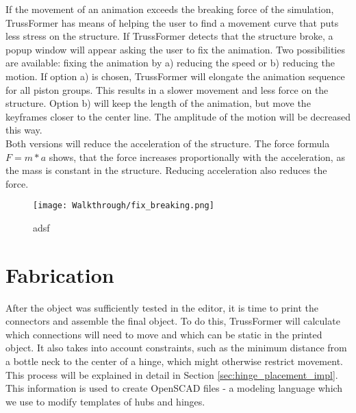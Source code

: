 If the movement of an animation exceeds the breaking force of the simulation, TrussFormer has means of helping the user to find a movement curve that puts less stress on the structure. If TrussFormer detects that the structure broke, a popup window will appear asking the user to fix the animation. Two possibilities are available: fixing the animation by a) reducing the speed or b) reducing the motion. If option a) is chosen, TrussFormer will elongate the animation sequence for all piston groups. This results in a slower movement and less force on the structure. Option b) will keep the length of the animation, but move the keyframes closer to the center line. The amplitude of the motion will be decreased this way.\\
Both versions will reduce the acceleration of the structure. The force formula $F = m * a$ shows, that the force increases proportionally with the acceleration, as the mass is constant in the structure. Reducing acceleration also reduces the force.
\begin{figure}[h!]
    \texttt{[image: Walkthrough/fix\_breaking.png]}
    \centering
    \caption{adsf}
    \label{fig:fix_breaking}
\end{figure}

\section{Fabrication}
After the object was sufficiently tested in the editor, it is time to print the connectors and assemble the final object. To do this, TrussFormer will calculate which connections will need to move and which can be static in the printed object. It also takes into account constraints, such as the minimum distance from a bottle neck to the center of a hinge, which might otherwise restrict movement. This process will be explained in detail in Section \ref{sec:hinge_placement_impl}. This information is used to create OpenSCAD files - a modeling language which we use to modify templates of hubs and hinges.

